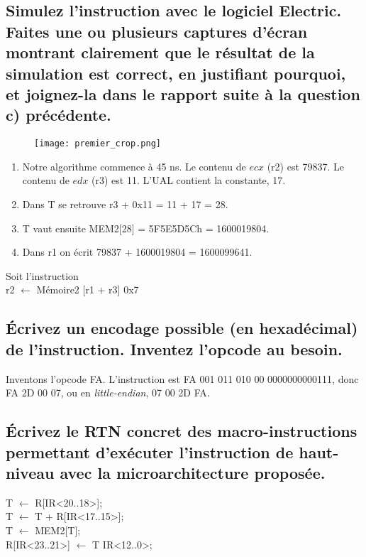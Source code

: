 \documentclass[10pt,letterpaper]{article}
\begin{document}
\subsection{Simulez l'instruction avec le logiciel Electric. Faites une ou plusieurs captures d'écran montrant clairement que le résultat de la simulation est correct, en justifiant pourquoi, et joignez-la dans le rapport suite à la question c) précédente.}
\begin{figure}[h]
\centering
\texttt{[image: premier\_crop.png]}
\end{figure}
\begin{enumerate}
\item Notre algorithme commence à 45 ns. Le contenu de $ecx$ (r2) est 79837. Le contenu de $edx$ (r3) est 11. L'UAL contient la constante, 17.
\item Dans T se retrouve r3 + 0x11 = 11 + 17 = 28.
\item T vaut ensuite MEM2[28] = 5F5E5D5Ch = 1600019804.
\item Dans r1 on écrit 79837 + 1600019804 = 1600099641.
\end{enumerate}
\bigskip

Soit l'instruction \\
\hspace{2em} r2 $\gets$ Mémoire2 [r1 + r3] \text{<}\text{<} 0x7
\subsection{Écrivez un encodage possible (en hexadécimal) de l'instruction. Inventez l'opcode au besoin.}
Inventons l'opcode FA. L'instruction est FA 001 011 010 00 0000000000111, donc FA 2D 00 07, ou en \textit{little-endian}, 07 00 2D FA.
\medskip

\subsection{Écrivez le RTN concret des macro-instructions permettant d'exécuter l'instruction de haut-niveau avec la microarchitecture proposée.}
\noindent
T $\gets$ R[IR<20..18>]; \\
T $\gets$ T + R[IR<17..15>]; \\
T $\gets$ MEM2[T]; \\
R[IR<23..21>] $\gets$ T \text{<}\text{<} IR<12..0>;
\medskip
\end{document}
